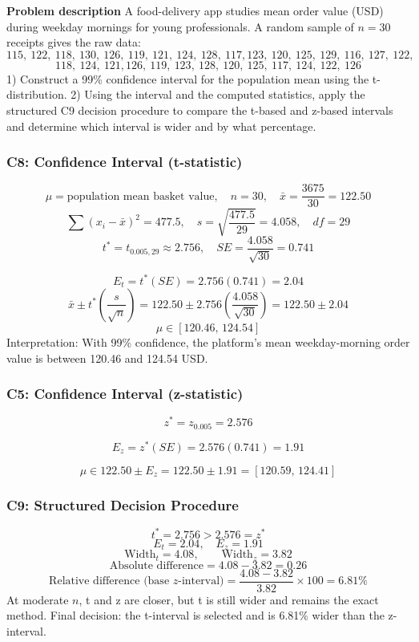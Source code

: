\begin{ExamProblems}
		\newpage
		\item
		\textbf{Problem description}
		A food-delivery app studies mean order value (USD) during weekday mornings for young professionals.
		A random sample of $n=30$ receipts gives the raw data:
		\[
		115,\ 122,\ 118,\ 130,\ 126,\ 119,\ 121,\ 124,\ 128,\ 117,
		123,\ 120,\ 125,\ 129,\ 116,\ 127,\ 122,\]
		\[	 118,\ 124,\ 121,
		126,\ 119,\ 123,\ 128,\ 120,\ 125,\ 117,\ 124,\ 122,\ 126
		\]
		1) Construct a 99\% confidence interval for the population mean using the t-distribution.
		2) Using the interval and the computed statistics, apply the structured C9 decision procedure to compare the t-based and z-based intervals and determine which interval is wider and by what percentage.

		\subsubsection*{C8: Confidence Interval (t-statistic)}
		\[
		\mu=\text{population mean basket value},\quad n=30,\quad \bar{x}=\frac{3675}{30}=122.50
		\]
		\[
		\sum (x_i-\bar{x})^2=477.5,\quad s=\sqrt{\frac{477.5}{29}}=4.058,\quad df=29
		\]
		\[
		t^*=t_{0.005,29}\approx 2.756,\quad SE=\frac{4.058}{\sqrt{30}}=0.741
		\]

		\[
		E_t=t^*(SE)=2.756(0.741)=2.04
		\]
		\[
		\bar{x}\pm t^*\left(\frac{s}{\sqrt{n}}\right)=122.50\pm 2.756\left(\frac{4.058}{\sqrt{30}}\right)=122.50\pm 2.04
		\]
		\[
		\mu\in[120.46,\,124.54]
		\]
		Interpretation: With 99\% confidence, the platform's mean weekday-morning order value is between 120.46 and 124.54 USD.

		\subsubsection*{C5: Confidence Interval (z-statistic)}
		\[
		z^*=z_{0.005}=2.576
		\]

		\[
		E_z=z^*(SE)=2.576(0.741)=1.91
		\]

		\[
		\mu\in 122.50\pm E_z=122.50\pm 1.91=[120.59,\,124.41]
		\]

		\subsubsection*{C9: Structured Decision Procedure}
		\[
		t^*=2.756>2.576=z^*
		\]
		\[
		E_t=2.04,\quad E_z=1.91
		\]
		\[
		\text{Width}_t=4.08,\qquad \text{Width}_z=3.82
		\]
		\[
		\text{Absolute difference}=4.08-3.82=0.26
		\]
		\[
		\text{Relative difference (base }z\text{-interval)}=\frac{4.08-3.82}{3.82}\times 100=6.81\%
		\]
		At moderate $n$, t and z are closer, but t is still wider and remains the exact method.
		Final decision: the t-interval is selected and is 6.81\% wider than the z-interval.


\end{ExamProblems}
